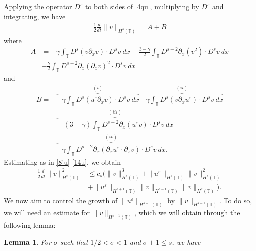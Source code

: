 \documentclass[12pt,reqno]{amsart}
\newcommand{\p}{\partial}
\newcommand{\ci}{\mathbb{T}}
\newcommand{\ee}{\varepsilon}
\theoremstyle{plain}  %
\newtheorem{lemma}{Lemma}
\theoremstyle{definition}
\begin{document}
\begin{appendices}
Applying the operator $D^s$ to both sides of \eqref{4qu}, multiplying by
	$D^s$ and integrating, we have
	\begin{equation}
		\begin{split}
			\frac{1}{2}\frac{d}{dt} \|v\|_{H^s(\ci)} = A + B
			\label{6qu}
		\end{split}
	\end{equation}
	where
	\begin{equation}
		\begin{split}
			A
			& =  -\gamma \int_{\ci} D^s(v \p_x v) \cdot D^s v \
			dx
			- \frac{3- \gamma}{2} \int_\ci D^{s-2} \p_x (v^2) \cdot D^s v
			\ dx
			\\
			& - \frac{\gamma}{2}\int_\ci D^{s-2} \p_x (\p_x v)^2 \cdot D^s
			v \ dx
			\label{7qu}
		\end{split}
	\end{equation}
	and
	\begin{equation}
		\begin{split}
			B 
			 = &  \overbrace{-\gamma \int_\ci D^s (u^\ee \p_x v) \cdot D^s v \
			 dx}^{(i)}
			 \ \overbrace{-\gamma \int_\ci D^s (v \p_x u^\ee ) \cdot D^s v \
			 dx}^{(ii)}
			 \\
			  & \overbrace{- \ ( 3- \gamma) \int_\ci D^{s-2} \p_x (u^\ee v) \cdot D^s
			 v \ dx}^{(iii)}
			 \\
			 & \overbrace{-\gamma \int_\ci D^{s-2} \p_x
			(\p_x u^\ee \cdot \p_x v) \cdot D^s v \
			dx}^{(iv)}.
			\label{8qu}
		\end{split}
	\end{equation}
	Estimating as in \eqref{8'u}-\eqref{14u}, we obtain
	\begin{equation}
		\begin{split}
			\frac{1}{2}\frac{d}{dt}\|v\|_{H^{s}(\ci)}^2
			& \le c_s(\|v\|_{H^s(\ci)}^3 + \|u^\ee\|_{H^s(\ci)}
			\|v\|_{H^s(\ci)}^2
			\\
			& + \|u^\ee\|_{H^{s+1}(\ci)}
			\|v\|_{H^{s-1}(\ci)} \|v\|_{H^s(\ci)}).
			\label{15qu}
		\end{split}
	\end{equation}
	We now aim to control the growth of $\|u^\ee\|_{H^{s+1}(\ci)}$ by
	$\|v\|_{H^{s-1}(\ci)}$. To do so, we will need an estimate for
	$\|v\|_{H^{s-1}(\ci)}$, which we will obtain through the following lemma:
%
%
%
%
\begin{lemma}
	\label{lem:left}
	For $\sigma$ such that $1/2 < \sigma < 1$ and $\sigma + 1 \le s$, we have
	\begin{equation}
	\label{lem6rq}
	\begin{split}

\end{split}
\end{equation}
\end{lemma}
\end{appendices}
\end{document}
